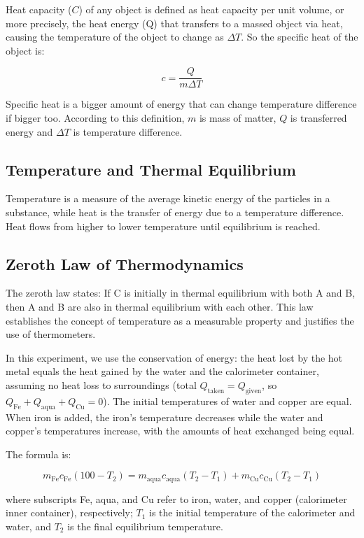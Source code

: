 \documentclass[12pt, a4paper]{article}
\begin{document}
Heat capacity ($C$) of any object is defined as heat capacity per unit volume, or more precisely, the heat energy (Q) that transfers to a massed object via heat, causing the temperature of the object to change as $\Delta T$. So the specific heat of the object is:

\[ c = \frac{Q}{m \Delta T} \]

Specific heat is a bigger amount of energy that can change temperature difference if bigger too. According to this definition, $m$ is mass of matter, $Q$ is transferred energy and $\Delta T$ is temperature difference.

\subsection{Temperature and Thermal Equilibrium}
Temperature is a measure of the average kinetic energy of the particles in a substance, while heat is the transfer of energy due to a temperature difference. Heat flows from higher to lower temperature until equilibrium is reached.

\subsection{Zeroth Law of Thermodynamics}
The zeroth law states: If C is initially in thermal equilibrium with both A and B, then A and B are also in thermal equilibrium with each other. This law establishes the concept of temperature as a measurable property and justifies the use of thermometers.

In this experiment, we use the conservation of energy: the heat lost by the hot metal equals the heat gained by the water and the calorimeter container, assuming no heat loss to surroundings (total $Q_{\text{taken}} = Q_{\text{given}}$, so $Q_{\text{Fe}} + Q_{\text{aqua}} + Q_{\text{Cu}} = 0$). The initial temperatures of water and copper are equal. When iron is added, the iron's temperature decreases while the water and copper's temperatures increase, with the amounts of heat exchanged being equal.

The formula is:

\[ m_{\text{Fe}} c_{\text{Fe}} (100 - T_2) = m_{\text{aqua}} c_{\text{aqua}} (T_2 - T_1) + m_{\text{Cu}} c_{\text{Cu}} (T_2 - T_1) \]

where subscripts Fe, aqua, and Cu refer to iron, water, and copper (calorimeter inner container), respectively; $T_1$ is the initial temperature of the calorimeter and water, and $T_2$ is the final equilibrium temperature.
\end{document}

